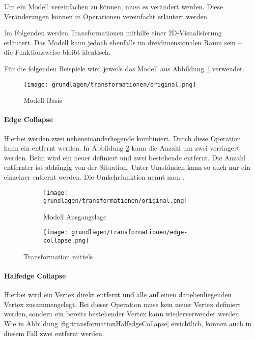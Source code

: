 Um ein Modell vereinfachen zu können, muss es verändert werden.
Diese Veränderungen können in Operationen vereinfacht erläutert werden.

Im Folgenden werden Transformationen mithilfe einer 2D-Visualisierung erläutert. Das Modell kann jedoch ebenfalls im dreidimensionalen Raum sein – die Funktionsweise bleibt identisch.

Für die folgenden Beispiele wird jeweils das Modell aus Abbildung \ref{fig:transformationOriginal} verwendet.

\begin{figure}[H]
  \centering
  \texttt{[image: grundlagen/transformationen/original.png]}
  \caption{Modell Basis}
  \label{fig:transformationOriginal}
\end{figure}

\paragraph{Edge Collapse}
Hierbei werden zwei nebeneinanderliegende  kombiniert. Durch diese Operation kann ein  entfernt werden. In Abbildung \ref{fig:transformationEdgeCollapse} kann die Anzahl  um zwei verringert werden. Beim  wird ein neuer  definiert und zwei bestehende entfernt. Die Anzahl entfernter  ist abhängig von der Situation. Unter Umständen kann so auch nur ein einzelner  entfernt werden.
Die Umkehrfunktion nennt man .

\begin{figure}[H]
  \centering
  \begin{subfigure}{.5\textwidth}
    \centering
    \texttt{[image: grundlagen/transformationen/original.png]}
    \caption{Modell Ausgangslage}
  \end{subfigure}%
  \begin{subfigure}{.5\textwidth}
    \centering
    \texttt{[image: grundlagen/transformationen/edge-collapse.png]}
    \caption{}
  \end{subfigure}
  \caption{Transformation mittels }
  \label{fig:transformationEdgeCollapse}
\end{figure}

\paragraph{Halfedge Collapse}
Hierbei wird ein Vertex direkt entfernt und alle  auf einen danebenliegenden Vertex zusammengelegt. Bei dieser Operation muss kein neuer Vertex definiert werden, sondern ein bereits bestehender Vertex kann wiederverwendet werden. Wie in Abbildung \ref{fig:transformationHalfedgeCollapse} ersichtlich, können auch in diesem Fall zwei  entfernt werden.

